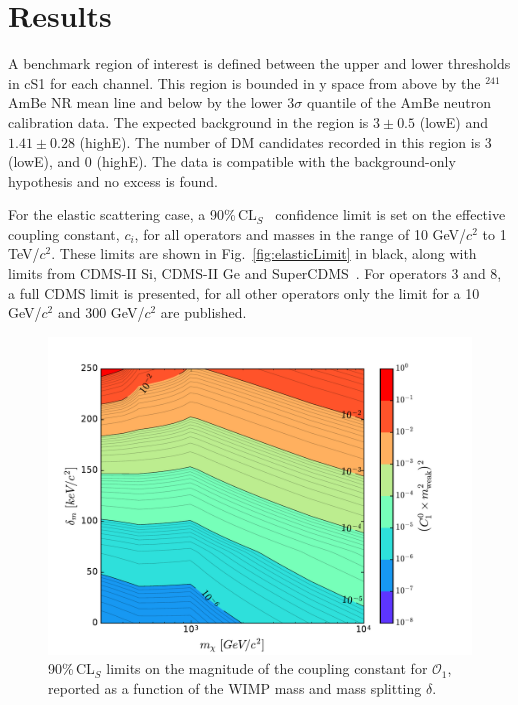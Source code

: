 \section{Results}

A benchmark region of interest is defined between the upper and lower thresholds in cS1 for each channel. This region
is bounded in y space from above by the $^{241}$AmBe NR mean line and below by the lower 3$\sigma$ quantile of the AmBe neutron calibration data. The expected background in the region is $3 \pm 0.5$ (lowE) and $1.41 \pm 0.28$ (highE). The number of DM candidates recorded in this region is 3 (lowE), and 0 (highE). The data is compatible with the background-only hypothesis and no excess is found. 

For the elastic scattering case, a 90\%\,CL$_S$~\cite{cls} confidence limit is set on the effective coupling constant, $c_i$,  for all operators and masses in the range of 10 GeV/$c^2$ to 1 TeV/$c^2$. 
These limits are shown in Fig.~\ref{fig:elasticLimit} in black, along with limits from CDMS-II Si, CDMS-II Ge and SuperCDMS~\cite{CDMSEFT}. For operators 3 and 8, a full CDMS limit is presented, for all other operators only the limit for a 10 GeV/$c^2$ and 300 GeV/$c^2$ are published.  

\begin{figure}
\centerline{\includegraphics[width=1.\linewidth]{Figures/O1_inelastic_lim_2D}}
\caption{90\%\,CL$_S$ limits on the magnitude of the coupling constant for $\mathcal{O}_1$, reported as a function of the WIMP mass and mass splitting $\delta$.}
\label{fig:O1Inel}
\end{figure}  

